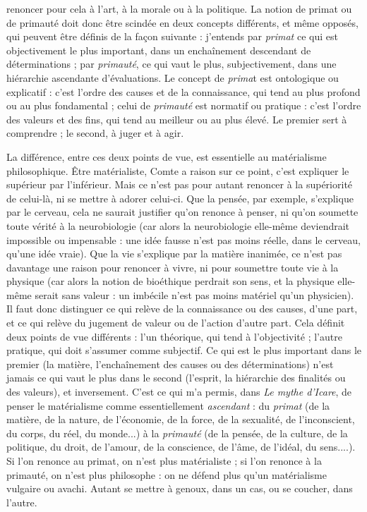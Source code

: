 renoncer pour cela à l’art, à la morale ou à la politique. La notion de primat ou
de primauté doit donc être scindée en deux concepts différents, et même
opposés, qui peuvent être définis de la façon suivante : j’entends par {\it primat} ce
qui est objectivement le plus important, dans un enchaînement descendant de
déterminations ; par {\it primauté}, ce qui vaut le plus, subjectivement, dans une
hiérarchie ascendante d'évaluations. Le concept de {\it prima}t est ontologique ou
explicatif : c’est l’ordre des causes et de la connaissance, qui tend au plus profond
ou au plus fondamental ; celui de {\it primauté} est normatif ou pratique : c’est
l’ordre des valeurs et des fins, qui tend au meilleur ou au plus élevé. Le premier
sert à comprendre ; le second, à juger et à agir.

La différence, entre ces deux points de vue, est essentielle au matérialisme
philosophique. Être matérialiste, Comte a raison sur ce point, c’est expliquer le
supérieur par l’inférieur. Mais ce n’est pas pour autant renoncer à la supériorité
de celui-là, ni se mettre à adorer celui-ci. Que la pensée, par exemple,
s'explique par le cerveau, cela ne saurait justifier qu’on renonce à penser, ni
qu’on soumette toute vérité à la neurobiologie (car alors la neurobiologie elle-même
deviendrait impossible ou impensable : une idée fausse n’est pas moins
réelle, dans le cerveau, qu’une idée vraie). Que la vie s'explique par la matière
inanimée, ce n’est pas davantage une raison pour renoncer à vivre, ni pour soumettre
toute vie à la physique (car alors la notion de bioéthique perdrait son
sens, et la physique elle-même serait sans valeur : un imbécile n’est pas moins
matériel qu’un physicien). Il faut donc distinguer ce qui relève de la connaissance
ou des causes, d’une part, et ce qui relève du jugement de valeur ou de
l’action d’autre part. Cela définit deux points de vue différents : l’un théorique,
qui tend à l’objectivité ; l’autre pratique, qui doit s’assumer comme subjectif.
Ce qui est le plus important dans le premier (la matière, l’enchaînement des
causes ou des déterminations) n’est jamais ce qui vaut le plus dans le second
(l'esprit, la hiérarchie des finalités ou des valeurs), et inversement. C’est ce qui
m'a permis, dans {\it Le mythe d'Icare}, de penser le matérialisme comme essentiellement
{\it ascendant} : du {\it primat} (de la matière, de la nature, de l’économie, de la
force, de la sexualité, de l'inconscient, du corps, du réel, du monde...) à la {\it primauté}
(de la pensée, de la culture, de la politique, du droit, de l'amour, de la
conscience, de l’âme, de l’idéal, du sens....). Si l’on renonce au primat, on n’est
plus matérialiste ; si l’on renonce à la primauté, on n’est plus philosophe : on
ne défend plus qu’un matérialisme vulgaire ou avachi. Autant se mettre à
genoux, dans un cas, ou se coucher, dans l’autre.

